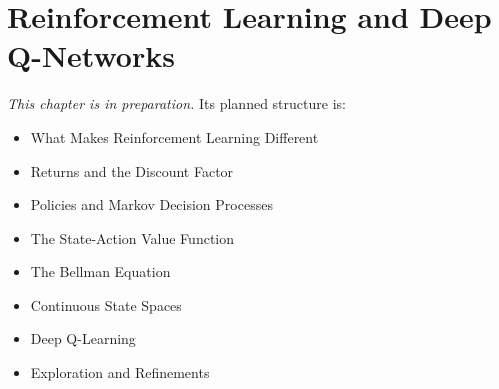 
\chapter{Reinforcement Learning and Deep Q-Networks}
\label{ch:ch17}

\noindent\textit{This chapter is in preparation.} Its planned structure is:

\begin{itemize}
  \item What Makes Reinforcement Learning Different
  \item Returns and the Discount Factor
  \item Policies and Markov Decision Processes
  \item The State-Action Value Function
  \item The Bellman Equation
  \item Continuous State Spaces
  \item Deep Q-Learning
  \item Exploration and Refinements
\end{itemize}
